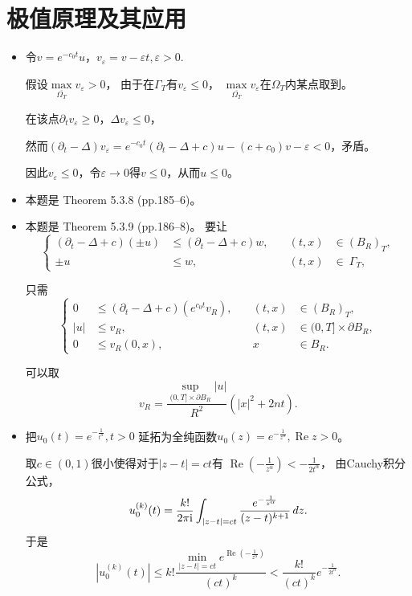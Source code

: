 \section{极值原理及其应用}
\begin{itemize}
\item[1.] 令$v=e^{-c_0t}u$，$v_\varepsilon=v-\varepsilon t,\varepsilon>0$.

假设$\max\limits_{\overline{\varOmega_T}}v_\varepsilon>0$，
由于在$\varGamma_T$有$v_\varepsilon\leqslant0$，
$\max\limits_{\overline{\varOmega_T}}v_\varepsilon$在$\varOmega_T$内某点取到。

在该点$\partial_t v_\varepsilon\geqslant0$，$\Delta v_\varepsilon\leqslant0$，

然而$(\partial_t-\Delta)v_\varepsilon
=e^{-c_0t}(\partial_t-\Delta+c)u-(c+c_0)v-\varepsilon<0$，矛盾。

因此$v_\varepsilon\leqslant0$，令$\varepsilon\rightarrow0$得$v\leqslant0$，从而$u\leqslant0$。

\item[2.] 本题是\cite{Han} Theorem 5.3.8 (pp.185--6)。

\item[3.] 本题是\cite{Han} Theorem 5.3.9 (pp.186--8)。
要让\begin{equation*}\left\{
\begin{aligned}
    (\partial_t-\Delta+c)(\pm u)&\leqslant(\partial_t-\Delta+c)w,&\quad(t,x)&\in(B_R)_T,\\
    \pm u&\leqslant w,&\quad(t,x)&\in\ \varGamma_T,
\end{aligned}\right.\end{equation*}

只需\begin{equation*}
    \left\{
\begin{aligned}
    0&\leqslant(\partial_t-\Delta+c)(e^{c_0t}v_R),&\quad(t,x)&\in (B_R)_T,\\
    |u|&\leqslant v_R,&\quad(t,x)&\in(0,T]\times\partial B_R,\\
    0&\leqslant v_R(0,x),&\quad x&\in B_R.
\end{aligned}\right.
\end{equation*}

可以取
$$v_R=\frac{\sup\limits_{(0,T]\times\partial B_R}|u|}{R^2}(|x|^2+2nt).$$

\item[7.] 把$u_0(t)=e^{-\frac{1}{t^\alpha}},t>0$
延拓为全纯函数$u_0(z)=e^{-\frac{1}{z^\alpha}},\operatorname{Re}z>0$。

取$c\in(0,1)$很小使得对于$|z-t|=ct$有
$\operatorname{Re}\left(-\frac{1}{z^\alpha}\right)<-\frac{1}{2t^\alpha}$，
由Cauchy积分公式，
$$u_0^{(k)}(t)=\frac{k!}{2\pi{\rm i}}\int_{|z-t|=ct}\frac{e^{-\frac{1}{z^\alpha}}}{(z-t)^{k+1}}\,dz.$$
于是
$$|u_0^{(k)}(t)|\leqslant k!\frac{\min\limits_{|z-t|=ct}e^{\operatorname{Re}\left(-\frac{1}{z^\alpha}\right)}}{(ct)^{k}}
<\frac{k!}{(ct)^{k}}e^{-\frac{1}{2t^\alpha}}.$$


\end{itemize}
